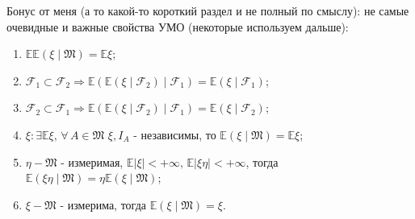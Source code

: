 \documentclass[12pt,a4paper]{article} %
\newcommand{\E}{\mathbb{E}}
\newcommand{\F}{\mathcal{F}}
\newcommand{\M}{\mathfrak{M}}
\begin{document}
	Бонус от меня (а то какой-то короткий раздел и не полный по смыслу): не самые очевидные и важные свойства УМО (некоторые используем дальше):
	\begin{enumerate}
		\item $\E\E(\xi\mid\M)=\E\xi$;
		\item $\F_1\subset\F_2\Rightarrow\E(\E(\xi\mid\F_2)\mid\F_1)=\E(\xi\mid\F_1)$;
		\item $\F_2\subset\F_1\Rightarrow\E(\E(\xi\mid\F_2)\mid\F_1)=\E(\xi\mid\F_2)$;
		\item $\xi:\exists\E\xi,\,\forall\, A\in\M\,\,\xi,I_A$ - независимы, то $\E(\xi\mid\M)=\E\xi$;
		\item $\eta - \M$ - измеримая, $\E|\xi|<+\infty,\,\E|\xi\eta|<+\infty$, тогда $\E(\xi\eta\mid\M)=\eta\E(\xi\mid\M)$;
		\item $\xi - \M$ - измерима, тогда $\E(\xi\mid\M)=\xi$.
	\end{enumerate}
\end{document}
